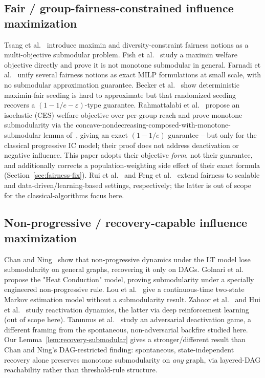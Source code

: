 \documentclass[journal]{IEEEtran}
\begin{document}
\subsection{Fair / group-fairness-constrained influence maximization}
Tsang et al.~\cite{tsang2019group} introduce maximin and diversity-constraint
fairness notions as a multi-objective submodular problem. Fish et
al.~\cite{fish2019gaps} study a maximin welfare objective directly and prove
it is not monotone submodular in general. Farnadi et
al.~\cite{farnadi2020unifying} unify several fairness notions as exact MILP
formulations at small scale, with no submodular approximation guarantee.
Becker et al.~\cite{becker2021fairness} show deterministic maximin-fair
seeding is hard to approximate but that randomized seeding recovers a
$(1-1/e-\varepsilon)$-type guarantee. Rahmattalabi et
al.~\cite{rahmattalabi2021fair} propose an isoelastic (CES) welfare objective
over per-group reach and prove monotone submodularity via the
concave-nondecreasing-composed-with-monotone-submodular lemma
of~\cite{lin2011class}, giving an exact $(1-1/e)$ guarantee -- but only for
the classical progressive IC model; their proof does not address
deactivation or negative influence. This paper adopts their objective
\emph{form}, not their guarantee, and additionally corrects a
population-weighting side effect of their exact formula (Section~\ref{sec:fairness-fix}).
Rui et al.~\cite{rui2023scalable} and Feng et al.~\cite{feng2023influence}
extend fairness to scalable and data-driven/learning-based settings,
respectively; the latter is out of scope for the classical-algorithms focus
here.

\subsection{Non-progressive / recovery-capable influence maximization}
Chan and Ning~\cite{chan2015influence} show that non-progressive dynamics
under the LT model lose submodularity on general graphs, recovering it only
on DAGs. Golnari et al.~\cite{golnari2014revisiting} propose the "Heat
Conduction" model, proving submodularity under a specially engineered
non-progressive rule. Lou et al.~\cite{lou2014modeling} give a continuous-time
two-state Markov estimation model without a submodularity result. Zahoor et
al.~\cite{zahoor2024influence} and Hui et al.~\cite{hui2024nonprogressive}
study reactivation dynamics, the latter via deep reinforcement learning
(out of scope here). Tan{\i}nm{\i}s et al.~\cite{taninmis2019influence} study
an adversarial deactivation game, a different framing from the spontaneous,
non-adversarial backfire studied here. Our Lemma~\ref{lem:recovery-submodular}
gives a stronger/different result than Chan and Ning's DAG-restricted
finding: spontaneous, state-independent recovery alone preserves monotone
submodularity on \emph{any} graph, via layered-DAG reachability rather than
threshold-rule structure.
\end{document}
